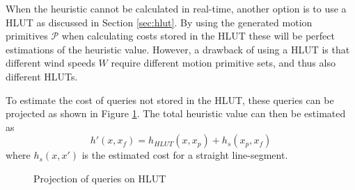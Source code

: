 When the heuristic cannot be calculated in real-time, another option is to use a HLUT as discussed in Section \ref{sec:hlut}. By using the generated 
motion primitives $\mathcal{P}$ when calculating costs stored in the HLUT these will be perfect estimations of the heuristic value. However, a drawback of 
using a HLUT is that different wind speeds $W$ require different motion primitive sets, and thus also different HLUTs. 

To estimate the cost of queries not stored in the HLUT, these queries can be projected as shown in Figure \ref{fig:hlut_proj}. The total heuristic value can then be estimated as 
\begin{equation}
    h'(x, x_f) = h_{HLUT}(x, x_p) + h_s(x_p, x_f)
\end{equation}
where $h_s(x, x')$ is the estimated cost for a straight line-segment.
\begin{figure}
    \begin{center}
    \end{center}
    \caption{Projection of queries on HLUT}
    \label{fig:hlut_proj}
\end{figure}